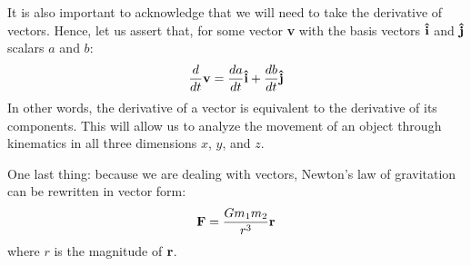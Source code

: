 It is also important to acknowledge that we will need to take the derivative of vectors. Hence, let us assert that, for some vector \textbf{v} with the basis vectors $\uvec{i}$ and $\uvec{j}$ scalars $a$ and $b$:
\begin{equation*}
	\frac{d}{dt}\bvec{v} = \frac{da}{dt}\uvec{i} + \frac{db}{dt}\uvec{j}
\end{equation*}
In other words, the derivative of a vector is equivalent to the derivative of its components.
This will allow us to analyze the movement of an object through kinematics in all three dimensions $x$, $y$, and $z$.

\newpage

One last thing: because we are dealing with vectors, Newton's law of gravitation can be rewritten in vector form:
\begin{equation*}
	\bm{\mathbf{F}} = \frac{Gm_1m_2}{r^3}\bm{\mathbf{r}}
\end{equation*}
where $r$ is the magnitude of $\bm{\mathbf{r}}$.

